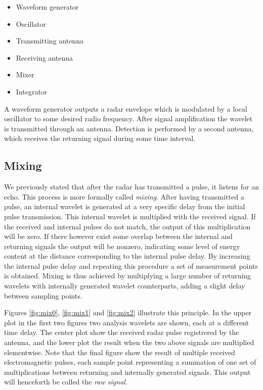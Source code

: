 \begin{itemize}
	\item Waveform generator
	\item Oscillator
	\item Transmitting antenna
	\item Receiving antenna
	\item Mixer
	\item Integrator
\end{itemize}



A waveform generator outputs a radar envelope which is modulated by a local oscillator to some desired radio frequency. After signal amplification the wavelet is transmitted through an antenna. Detection is performed by a second antenna, which receives the returning signal during some time interval. 

\subsection{Mixing}

We previously stated that after the radar has transmitted a pulse, it listens for an echo. This process is more formally called \textit{mixing}. After having transmitted a pulse, an internal wavelet is generated at a very specific delay from the initial pulse transmission. This internal wavelet is multiplied with the received signal. If the received and internal pulses do not match, the output of this multiplication will be zero. If there however exist some overlap between the internal and returning signals the output will be nonzero, indicating some level of energy content at the distance corresponding to the internal pulse delay. By increasing the internal pulse delay and repeating this procedure a set of measurement points is obtained. Mixing is thus achieved by multiplying a large number of returning wavelets with internally generated wavelet counterparts, adding a slight delay between sampling points. 


Figures \ref{fig:mix0}, \ref{fig:mix1} and \ref{fig:mix2} illustrate this principle. In the upper plot in the first two figures two analysis wavelets are shown, each at a different time delay. The center plot show the received radar pulse registrered by the antenna, and the lower plot the result when the two above signals are multiplied elementwise. Note that the final figure show the result of multiple received electromagnetic pulses, each sample point representing a summation of one set of multiplications between returning and internally generated signals. This output will henceforth be called the \emph{raw signal}.   

